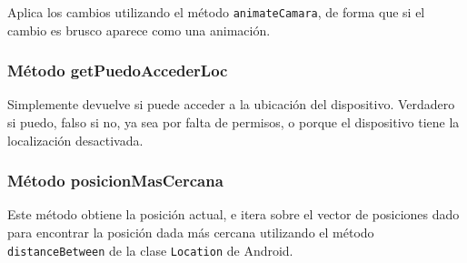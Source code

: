 Aplica los cambios utilizando el método \texttt{animateCamara}, de forma que si el cambio es brusco aparece como una animación.

\subsubsection{Método getPuedoAccederLoc}

Simplemente devuelve si puede acceder a la ubicación del dispositivo. Verdadero si puedo, falso si no, ya sea por falta de permisos, o porque el dispositivo tiene la localización desactivada.

\subsubsection{Método posicionMasCercana}

Este método obtiene la posición actual, e itera sobre el vector de posiciones dado para encontrar la posición dada más cercana utilizando el método \texttt{distanceBetween} de la clase \texttt{Location}\cite{locationAndroid} de Android.



